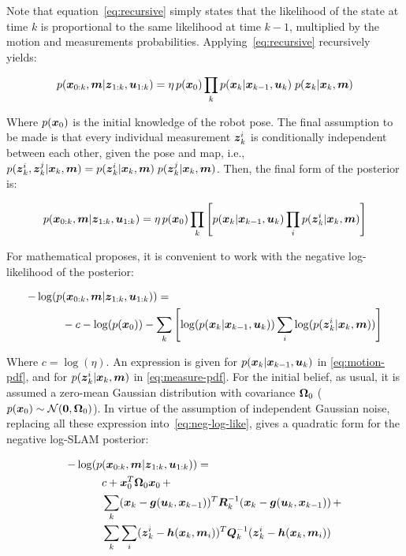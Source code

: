 Note that equation~\eqref{eq:recursive} simply states that the likelihood of the state at time $k$ is proportional to the same likelihood at time $k-1$, multiplied by the motion and measurements probabilities. Applying~\eqref{eq:recursive} recursively yields:
  
\begin{equation}
p(\boldsymbol{x}_{0:k},\boldsymbol{m}|\boldsymbol{z}_{1:k},\boldsymbol{u}_{1:k}) = 
\eta\, p(\boldsymbol{x}_0) \prod_{k} p(\boldsymbol{x}_k|\boldsymbol{x}_{k-1},\boldsymbol{u}_k)\;p(\boldsymbol{z}_k|\boldsymbol{x}_k,\boldsymbol{m})
\end{equation}

Where $p(\boldsymbol{x}_0)$ is the initial knowledge of the robot pose. The final assumption to be made is that every individual measurement $\boldsymbol{z}_k^i$ is conditionally independent between each other, given the pose and map, i.e., $p(\boldsymbol{z}_k^i,\boldsymbol{z}_k^j|\boldsymbol{x}_k,\boldsymbol{m}) = p(\boldsymbol{z}_k^i|\boldsymbol{x}_k,\boldsymbol{m})\; p(\boldsymbol{z}_k^j|\boldsymbol{x}_k,\boldsymbol{m})$. Then, the final form of the posterior is: 
  
\begin{equation}
p(\boldsymbol{x}_{0:k},\boldsymbol{m}|\boldsymbol{z}_{1:k},\boldsymbol{u}_{1:k}) = 
\eta\, p(\boldsymbol{x}_0) \prod_{k}\left[ p(\boldsymbol{x}_k|\boldsymbol{x}_{k-1},\boldsymbol{u}_k)\prod_{i}p(\boldsymbol{z}_k^i|\boldsymbol{x}_k,\boldsymbol{m})\right] 
\label{eq:posterior}
\end{equation} 

\noindent 
For mathematical proposes, it is convenient to work with the negative log-likelihood of the posterior:

\begin{equation}
\begin{split}
-\log(p&(\boldsymbol{x}_{0:k},\boldsymbol{m}|\boldsymbol{z}_{1:k},\boldsymbol{u}_{1:k})) =\\ 
&-c - \log(p(\boldsymbol{x}_0)) - \sum_{k}\left[ \log(p(\boldsymbol{x}_k|\boldsymbol{x}_{k-1},\boldsymbol{u}_k))\sum_{i}\log(p(\boldsymbol{z}_k^i|\boldsymbol{x}_k,\boldsymbol{m}))\right] 
\end{split}
\label{eq:neg-log-like}
\end{equation}

Where $c=\log(\eta)$. An expression is given for $p(\boldsymbol{x}_k|\boldsymbol{x}_{k-1},\boldsymbol{u}_k)$ in \eqref{eq:motion-pdf}, and for $p(\boldsymbol{z}_k^i|\boldsymbol{x}_k,\boldsymbol{m})$ in \eqref{eq:measure-pdf}. For the initial belief, as usual, it is assumed a zero-mean Gaussian distribution with covariance $\boldsymbol{\Omega}_0$ ($p(\boldsymbol{x}_0)\sim\mathcal{N}(\boldsymbol{0},\boldsymbol{\Omega}_0)$). In virtue of the assumption of independent Gaussian noise, replacing all these expression into~\eqref{eq:neg-log-like}, gives a quadratic form for the negative log-SLAM posterior:

\begin{equation}
\begin{split}
-\log(p&(\boldsymbol{x}_{0:k},\boldsymbol{m}|\boldsymbol{z}_{1:k},\boldsymbol{u}_{1:k})) =\\ 
&c+\boldsymbol{x}_0^T \boldsymbol{\Omega}_0 \boldsymbol{x}_0\,+\\
&\sum_{k} (\boldsymbol{x}_k-\boldsymbol{g}(\boldsymbol{u}_k,\boldsymbol{x}_{k-1}))^T
\boldsymbol{R}_k^{-1}(\boldsymbol{x}_k-\boldsymbol{g}(\boldsymbol{u}_k,\boldsymbol{x}_{k-1}))\,+\\
&\sum_{k}\sum_{i}(\boldsymbol{z}_k^i-\boldsymbol{h}(\boldsymbol{x}_k,\boldsymbol{m}_i))^T
\boldsymbol{Q}_k^{-1}(\boldsymbol{z}_k^i-\boldsymbol{h}(\boldsymbol{x}_k,\boldsymbol{m}_i))
\label{eq:quadratic}
\end{split}
\end{equation}

